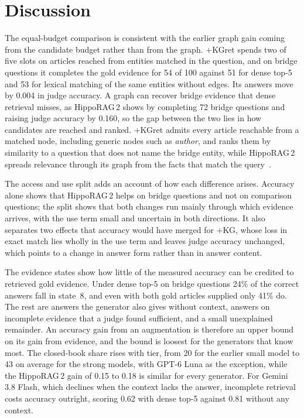 \documentclass[preprint,12pt]{elsarticle}
\begin{document}
\section{Discussion}
\label{sec:discussion}

The equal-budget comparison is consistent with the earlier graph gain coming
from the candidate budget rather than from the graph. +KGret spends two of five slots on articles
reached from entities matched in the question, and on bridge questions it
completes the gold evidence for 54 of 100 against 51 for dense top-5 and 53
for lexical matching of the same entities without edges. Its answers move by
0.004 in judge accuracy. A graph can recover bridge evidence that dense
retrieval misses, as HippoRAG\,2 shows by completing 72 bridge questions and
raising judge accuracy by 0.160, so the gap between the two lies in how
candidates are reached and ranked. +KGret admits every article reachable from
a matched node, including generic nodes such as \emph{author}, and ranks them
by similarity to a question that does not name the bridge entity, while
HippoRAG\,2 spreads relevance through its graph from the facts that match the
query~\cite{gutierrez2025hipporag2}.

The access and use split adds an account of how each difference arises.
Accuracy alone shows that HippoRAG\,2 helps on bridge questions and not on
comparison questions; the split shows that both changes run mainly through
which evidence arrives, with the use term small and uncertain in both
directions. It also separates two effects that accuracy would have merged for
+KG, whose loss in exact match lies wholly in the use term and leaves judge
accuracy unchanged, which points to a change in answer form rather than in
answer content.

The evidence states show how little of the measured accuracy can be credited
to retrieved gold evidence. Under dense top-5 on bridge questions 24\% of the
correct answers fall in state~8, and even with both gold articles supplied
only 41\% do. The rest are answers the generator also gives without context,
answers on incomplete evidence that a judge found sufficient, and a small
unexplained remainder. An accuracy gain from an augmentation is therefore an
upper bound on its gain from evidence, and the bound is loosest for the
generators that know most. The closed-book share rises with tier, from 20 for
the earlier small model to 43 on average for the strong models, with GPT-6
Luna as the exception, while the HippoRAG\,2 gain of 0.15 to 0.18 is similar
for every generator. For Gemini 3.8 Flash, which declines when the context
lacks the answer, incomplete retrieval costs accuracy outright, scoring 0.62
with dense top-5 against 0.81 without any context.
\end{document}
